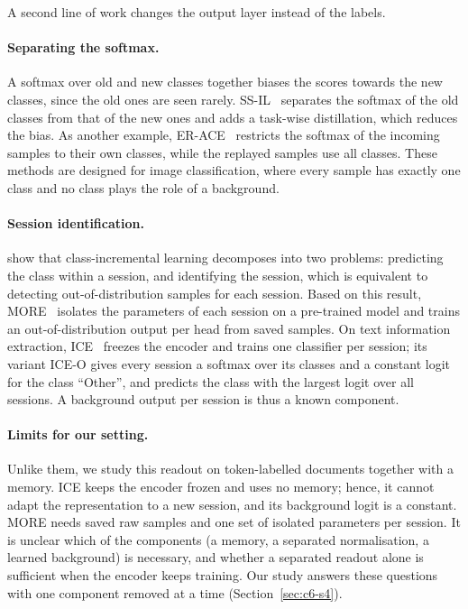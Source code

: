 A second line of work changes the output layer instead of the labels.

\paragraph{Separating the softmax.} A softmax over old and new classes together biases the
scores towards the new classes, since the old ones are seen rarely.
SS-IL~\citep{ahn2021ssil} separates the softmax of the old classes from that of the new
ones and adds a task-wise distillation, which reduces the bias. As another example,
ER-ACE~\citep{caccia2022erace} restricts the softmax of the incoming samples to their own
classes, while the replayed samples use all classes. These methods are designed for image
classification, where every sample has exactly one class and no class plays the role of a
background.

\paragraph{Session identification.} \citet{kim2022theoretical} show that class-incremental
learning decomposes into two problems: predicting the class within a session, and
identifying the session, which is equivalent to detecting out-of-distribution samples for
each session. Based on this result, MORE~\citep{kim2022more} isolates the parameters of
each session on a pre-trained model and trains an out-of-distribution output per head from
saved samples. On text information extraction, ICE~\citep{liu2023ice} freezes the encoder
and trains one classifier per session; its variant ICE-O gives every session a softmax
over its classes and a constant logit for the class ``Other'', and predicts the class with
the largest logit over all sessions. A background output per session is thus a known
component.

\paragraph{Limits for our setting.} Unlike them, we study this readout on token-labelled
documents together with a memory. ICE keeps the encoder frozen and uses no memory; hence,
it cannot adapt the representation to a new session, and its background logit is a
constant. MORE needs saved raw samples and one set of isolated parameters per session. It
is unclear which of the components (a memory, a separated normalisation, a learned
background) is necessary, and whether a separated readout alone is sufficient when the
encoder keeps training. Our study answers these questions with one component removed at a
time (Section~\ref{sec:c6-s4}).

